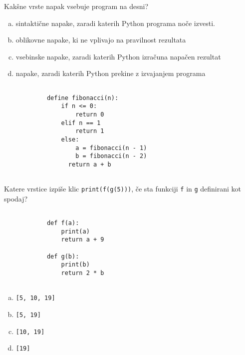 \documentclass[arhiv, 10pt]{../izpit}
\newcommand{\inlinepy}[1]{\texttt{#1}}
\begin{document}
        \naloga*
        \begin{multicols}{2}
        \noindent
        Kakšne vrste napak vsebuje program na desni?

        \begin{enumerate}[(a)]
\item sintaktične napake, zaradi katerih Python programa noče izvesti.
\item oblikovne napake, ki ne vplivajo na pravilnost rezultata
\item vsebinske napake, zaradi katerih Python izračuna napačen rezultat
\item napake, zaradi katerih Python prekine z izvajanjem programa
\end{enumerate}

        \columnbreak

        \begin{verbatim}
        
            define fibonacci(n):
                if n <= 0:
                    return 0
                elif n == 1
                    return 1
                else:
                    a = fibonacci(n - 1)
                    b = fibonacci(n - 2)
                  return a + b
            
        \end{verbatim}

        \end{multicols}

    
        \naloga*
        Katere vrstice izpiše klic \inlinepy{print(f(g(5)))}, če sta funkciji \inlinepy{f} in \inlinepy{g} definirani kot spodaj?

        \begin{multicols}{2}
        \begin{verbatim}
        
            def f(a):
                print(a)
                return a + 9

            def g(b):
                print(b)
                return 2 * b
        
        \end{verbatim}

        \begin{enumerate}[(a)]
\item \inlinepy{[5, 10, 19]}
\item \inlinepy{[5, 19]}
\item \inlinepy{[10, 19]}
\item \inlinepy{[19]}
\end{enumerate}

        \end{multicols}
    
\end{document}
